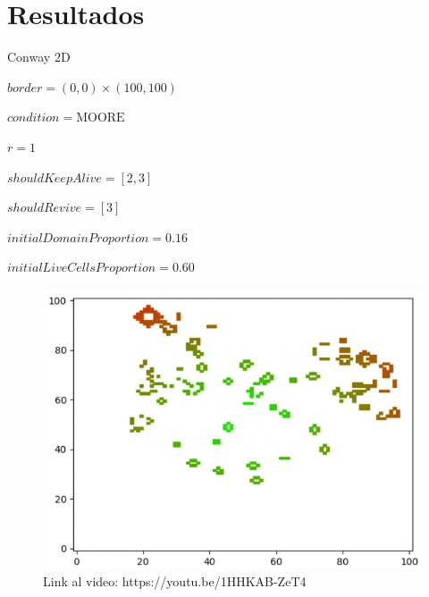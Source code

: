 \section{Resultados}


\begin{frame}[c]{Conway 2D}
    \begin{multicols}{2}
        {
            $border = (0, 0) \times (100, 100)$

            $condition = \text{MOORE}$

            $r = 1$

            $shouldKeepAlive = [2, 3]$

            $shouldRevive = [3]$

            $initialDomainProportion = 0.16$

            $initialLiveCellsProportion = 0.60$
        }

        {\begin{figure}[H]
             \centering
             \includegraphics[width=1\linewidth]{pic/conway2d/thumbnail_i60}
             \captionsetup{labelformat=empty}
             \caption{Link al video: https://youtu.be/1HHKAB-ZeT4}
             \label{fig:conway2d:thumbnail}
        \end{figure}}
    \end{multicols}
\end{frame}

